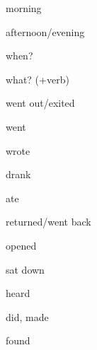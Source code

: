 \begin{flashcard}{\LARGE morning}
\LARGE {}
\end{flashcard}
\begin{flashcard}{\LARGE afternoon/evening}
\LARGE {}
\end{flashcard}
\begin{flashcard}{\LARGE when?}
\LARGE {}
\end{flashcard}
\begin{flashcard}{\LARGE what? (+verb)}
\LARGE {}
\end{flashcard}
\begin{flashcard}{\LARGE went out/exited}
\LARGE {}
\end{flashcard}
\begin{flashcard}{\LARGE went}
\LARGE {}
\end{flashcard}
\begin{flashcard}{\LARGE wrote}
\LARGE {}
\end{flashcard}
\begin{flashcard}{\LARGE drank}
\LARGE {}
\end{flashcard}
\begin{flashcard}{\LARGE ate}
\LARGE {}
\end{flashcard}
\begin{flashcard}{\LARGE returned/went back}
\LARGE {}
\end{flashcard}
\begin{flashcard}{\LARGE opened}
\LARGE {}
\end{flashcard}
\begin{flashcard}{\LARGE sat down}
\LARGE {}
\end{flashcard}
\begin{flashcard}{\LARGE heard}
\LARGE {}
\end{flashcard}
\begin{flashcard}{\LARGE did, made}
\LARGE {}
\end{flashcard}
\begin{flashcard}{\LARGE found}
\LARGE {}
\end{flashcard}
